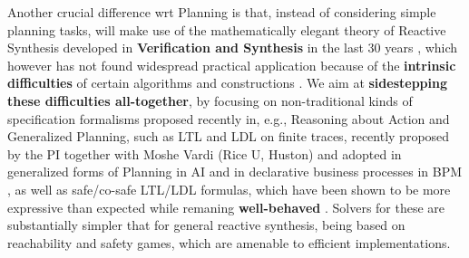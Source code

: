 Another crucial difference wrt Planning is that, instead of
considering simple planning tasks, \project will make use of the
mathematically elegant theory of Reactive Synthesis \cite{PnRo89}
developed in \textbf{Verification and Synthesis} in the last 30 years
\cite{EhlersLTV17}, which however has not found widespread practical
application because of the \textbf{intrinsic difficulties} of certain
algorithms and constructions \cite{TsaiFVT14,DFogartyKVW13}.
%
We aim at \textbf{sidestepping these difficulties all-together}, by
focusing on non-traditional kinds of specification formalisms proposed
recently in, e.g., Reasoning about Action and Generalized Planning,
such as LTL and LDL on finite traces, recently proposed by the PI
together with Moshe Vardi (Rice U, Huston) \cite{DeVa13,DeVa15,DeVa16}
and adopted in generalized forms of Planning in AI
\cite{TorresB15,CamachoTMBM17} and in declarative business processes
in BPM \cite{AalstPS09,DeGMGMM14,DeGMMP17}, as well as safe/co-safe
LTL/LDL formulas, which have been shown to be more expressive than
expected while remaning \textbf{well-behaved}
\cite{FinkbeinerS13,FiliotJR11,Lacerda0H15,FaymonvilleFRT17}. Solvers
for these are substantially simpler that for general reactive
synthesis, being based on reachability and safety games, which are
amenable to efficient implementations.






